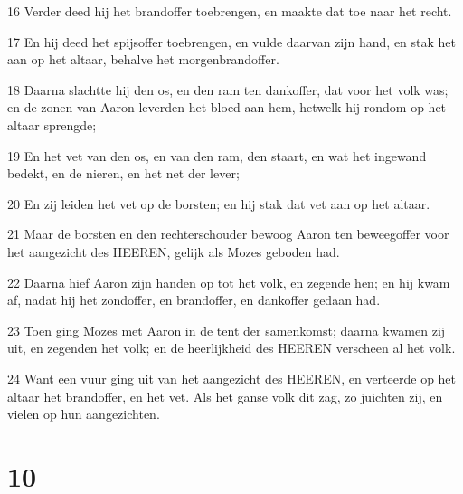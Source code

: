 \par 16 Verder deed hij het brandoffer toebrengen, en maakte dat toe naar het recht.
\par 17 En hij deed het spijsoffer toebrengen, en vulde daarvan zijn hand, en stak het aan op het altaar, behalve het morgenbrandoffer.
\par 18 Daarna slachtte hij den os, en den ram ten dankoffer, dat voor het volk was; en de zonen van Aaron leverden het bloed aan hem, hetwelk hij rondom op het altaar sprengde;
\par 19 En het vet van den os, en van den ram, den staart, en wat het ingewand bedekt, en de nieren, en het net der lever;
\par 20 En zij leiden het vet op de borsten; en hij stak dat vet aan op het altaar.
\par 21 Maar de borsten en den rechterschouder bewoog Aaron ten beweegoffer voor het aangezicht des HEEREN, gelijk als Mozes geboden had.
\par 22 Daarna hief Aaron zijn handen op tot het volk, en zegende hen; en hij kwam af, nadat hij het zondoffer, en brandoffer, en dankoffer gedaan had.
\par 23 Toen ging Mozes met Aaron in de tent der samenkomst; daarna kwamen zij uit, en zegenden het volk; en de heerlijkheid des HEEREN verscheen al het volk.
\par 24 Want een vuur ging uit van het aangezicht des HEEREN, en verteerde op het altaar het brandoffer, en het vet. Als het ganse volk dit zag, zo juichten zij, en vielen op hun aangezichten.

\chapter{10}

